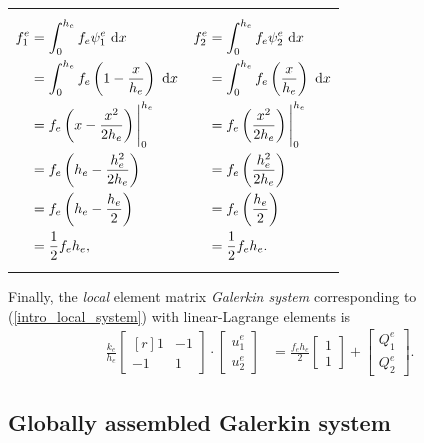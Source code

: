 \begin{table}[H]
\centering
\begin{tabularx}{\linewidth}{XX}
{\begin{align*}
  f_1^e &= \int_0^{h_e} f_e \psi_1^e \ \mathrm{d}x \\
        &= \int_0^{h_e} f_e \left( 1 - \frac{x}{h_e} \right) \ \mathrm{d}x \\
        &= f_e \left( x - \frac{x^2}{2h_e} \right) \Bigg|_0^{h_e} \\
        &= f_e \left( h_e - \frac{h_e^2}{2h_e} \right) \\
        &= f_e \left( h_e - \frac{h_e}{2} \right) \\
        &= \frac{1}{2} f_e h_e,
\end{align*}}
&
{\begin{align*}
  f_2^e &= \int_0^{h_e} f_e \psi_2^e \ \mathrm{d}x \\
        &= \int_0^{h_e} f_e \left( \frac{x}{h_e} \right) \ \mathrm{d}x \\
        &= f_e \left( \frac{x^2}{2h_e} \right) \Bigg|_0^{h_e} \\
        &= f_e \left( \frac{h_e^2}{2h_e} \right) \\
        &= f_e \left( \frac{h_e}{2} \right) \\
        &= \frac{1}{2} f_e h_e.
\end{align*}}
\end{tabularx}
\end{table}

Finally, the  \emph{local} element matrix \emph{Galerkin system} corresponding to (\ref{intro_local_system}) with linear-Lagrange elements is
\begin{align*}
 \frac{k_e}{h_e}
 \begin{bmatrix}[r]
   1 & -1 \\
   -1 & 1 
 \end{bmatrix} \cdot 
 \begin{bmatrix}
   u_1^e \\ u_2^e
 \end{bmatrix} &= 
 \frac{f_e h_e}{2}
 \begin{bmatrix}
   1 \\ 1
 \end{bmatrix} + 
 \begin{bmatrix}
   Q_1^e \\ Q_2^e
 \end{bmatrix}.
\end{align*}

\subsection{Globally assembled Galerkin system} \label{ssn_global_galerkin_assembly}

